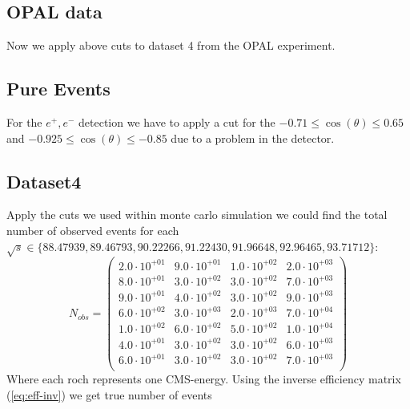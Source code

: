 \documentclass[]{article}
\begin{document}
\subsection{OPAL data}
Now we apply above cuts to dataset 4 from the OPAL experiment.

\subsection{Pure Events}
For the $e^+, e^-$ detection we have to apply a cut for the $-0.71 \leq \cos(\theta) \leq 0.65$ and  $-0.925 \leq \cos(\theta) \leq -0.85$ due to a problem in the detector.
\newline







\subsection{Dataset4}
Apply the cuts we used within monte carlo simulation we could find the total number of observed events for each $\sqrt{s} \in \{88.47939, 89.46793, 90.22266, 91.22430, 91.96648, 92.96465, 93.71712\}$:
\begin{equation}
N_{obs}=\begin{pmatrix}
   2.0\cdot 10^{+01} & 9.0\cdot 10^{+01} & 1.0\cdot 10^{+02} & 2.0\cdot 10^{+03} \\
   8.0\cdot 10^{+01} & 3.0\cdot 10^{+02} & 3.0\cdot 10^{+02} & 7.0\cdot 10^{+03} \\
   9.0\cdot 10^{+01} & 4.0\cdot 10^{+02} & 3.0\cdot 10^{+02} & 9.0\cdot 10^{+03} \\
   6.0\cdot 10^{+02} & 3.0\cdot 10^{+03} & 2.0\cdot 10^{+03} & 7.0\cdot 10^{+04} \\
   1.0\cdot 10^{+02} & 6.0\cdot 10^{+02} & 5.0\cdot 10^{+02} & 1.0\cdot 10^{+04} \\
   4.0\cdot 10^{+01} & 3.0\cdot 10^{+02} & 3.0\cdot 10^{+02} & 6.0\cdot 10^{+03} \\
   6.0\cdot 10^{+01} & 3.0\cdot 10^{+02} & 3.0\cdot 10^{+02} & 7.0\cdot 10^{+03} \\
\end{pmatrix}
\end{equation}
Where each roch represents one CMS-energy.
Using the inverse efficiency matrix (\ref{eq:eff-inv}) we get true number of events
\end{document}
